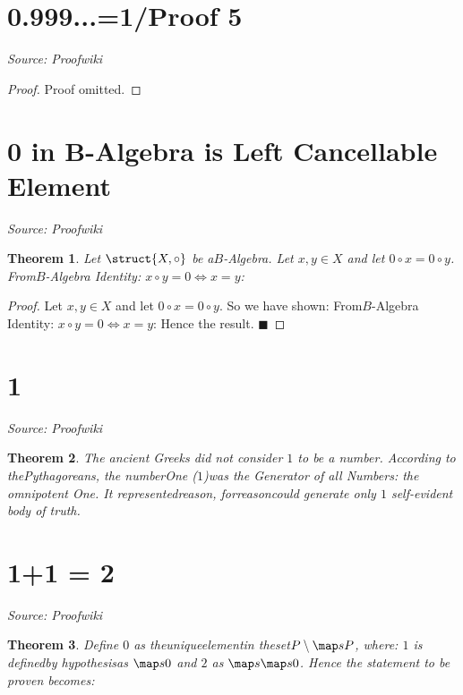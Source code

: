 \documentclass{article}
\newtheorem{theorem}{Theorem}
\begin{document}
\newpage

\section{0.999...=1/Proof 5}
\textit{Source: Proofwiki}

\begin{proof}
Proof omitted.
\end{proof}

\newpage

\section{0 in B-Algebra is Left Cancellable Element}
\textit{Source: Proofwiki}

\begin{theorem}
Let $\struct {X, \circ}$ be a$B$-Algebra. Let $x, y \in X$ and let $0 \circ x = 0 \circ y$. From$B$-Algebra Identity: $x \circ y = 0 \iff x = y$:
\end{theorem}

\begin{proof}
Let $x, y \in X$ and let $0 \circ x = 0 \circ y$. So we have shown: From$B$-Algebra Identity: $x \circ y = 0 \iff x = y$: Hence the result. $\blacksquare$
\end{proof}

\newpage

\section{1}
\textit{Source: Proofwiki}

\begin{theorem}
The ancient Greeks did not consider $1$ to be a number. According to thePythagoreans, the numberOne ($1$)was the Generator of all Numbers: the omnipotent One. It representedreason, forreasoncould generate only $1$ self-evident body of truth.
\end{theorem}

\newpage

\section{1+1 = 2}
\textit{Source: Proofwiki}

\begin{theorem}
Define $0$ as theuniqueelementin theset$P \setminus \map s P$, where: $1$ is definedby hypothesisas $\map s 0$ and $2$ as $\map s {\map s 0}$. Hence the statement to be proven becomes:
\end{theorem}
\end{document}
